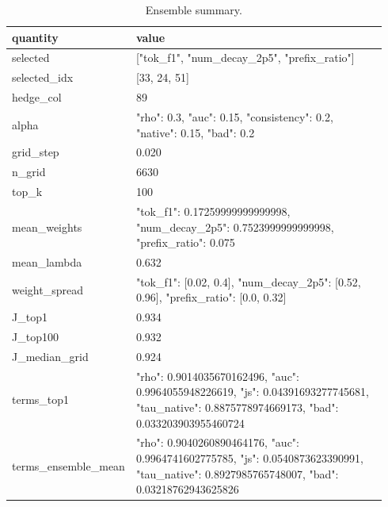 \scriptsize
\setlength{\tabcolsep}{3pt}
\begin{longtable}{p{0.110\linewidth}p{0.832\linewidth}}
\caption{Ensemble summary.}\label{tab:ensemble}\\
\toprule
quantity & value \\
\midrule
selected & ["tok\_\allowbreak{}f1", "num\_\allowbreak{}decay\_\allowbreak{}2p5", "prefix\_\allowbreak{}ratio"] \\
selected\_\allowbreak{}idx & [33, 24, 51] \\
hedge\_\allowbreak{}col & 89 \\
alpha & {"rho": 0.3, "auc": 0.15, "consistency": 0.2, "native": 0.15, "bad": 0.2} \\
grid\_\allowbreak{}step & 0.020 \\
n\_\allowbreak{}grid & 6630 \\
top\_\allowbreak{}k & 100 \\
mean\_\allowbreak{}weights & {"tok\_\allowbreak{}f1": 0.17259999999999998, "num\_\allowbreak{}decay\_\allowbreak{}2p5": 0.7523999999999998, "prefix\_\allowbreak{}ratio": 0.075} \\
mean\_\allowbreak{}lambda & 0.632 \\
weight\_\allowbreak{}spread & {"tok\_\allowbreak{}f1": [0.02, 0.4], "num\_\allowbreak{}decay\_\allowbreak{}2p5": [0.52, 0.96], "prefix\_\allowbreak{}ratio": [0.0, 0.32]} \\
J\_\allowbreak{}top1 & 0.934 \\
J\_\allowbreak{}top100 & 0.932 \\
J\_\allowbreak{}median\_\allowbreak{}grid & 0.924 \\
terms\_\allowbreak{}top1 & {"rho": 0.9014035670162496, "auc": 0.9964055948226619, "js": 0.04391693277745681, "tau\_\allowbreak{}native": 0.8875778974669173, "bad": 0.033203903955460724} \\
terms\_\allowbreak{}ensemble\_\allowbreak{}mean & {"rho": 0.9040260890464176, "auc": 0.9964741602775785, "js": 0.0540873623390991, "tau\_\allowbreak{}native": 0.8927985765748007, "bad": 0.03218762943625826} \\
\bottomrule
\end{longtable}
\normalsize
